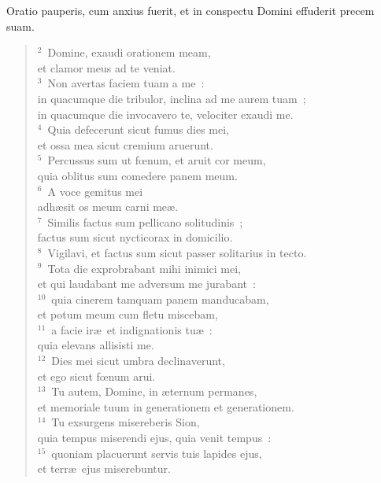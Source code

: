 \bchapter
\lettrine[lines=3,image=true,loversize=0.05,lraise=-0.03]{O}{}ratio pauperis, cum anxius fuerit, et in conspectu Domini effuderit precem suam.
\begin{flushleft}\begin{verse}\vspace{6pt}${}^{2}$~Domine, exaudi orationem meam,\\ et clamor meus ad te veniat.\\
${}^{3}$~Non avertas faciem tuam a me~:\\ in quacumque die tribulor, inclina ad me aurem tuam~;\\ in quacumque die invocavero te, velociter exaudi me.\\
${}^{4}$~Quia defecerunt sicut fumus dies mei,\\ et ossa mea sicut cremium aruerunt.\\
${}^{5}$~Percussus sum ut fœnum, et aruit cor meum,\\ quia oblitus sum comedere panem meum.\\
${}^{6}$~A voce gemitus mei\\ adh\ae sit os meum carni me\ae .\\
${}^{7}$~Similis factus sum pellicano solitudinis~;\\ factus sum sicut nycticorax in domicilio.\\
${}^{8}$~Vigilavi, et factus sum sicut passer solitarius in tecto.\\
${}^{9}$~Tota die exprobrabant mihi inimici mei,\\ et qui laudabant me adversum me jurabant~:\\
${}^{10}$~quia cinerem tamquam panem manducabam,\\ et potum meum cum fletu miscebam,\\
${}^{11}$~a facie ir\ae\ et indignationis tu\ae~:\\ quia elevans allisisti me.\\
${}^{12}$~Dies mei sicut umbra declinaverunt,\\ et ego sicut fœnum arui.\\
${}^{13}$~Tu autem, Domine, in \ae ternum permanes,\\ et memoriale tuum in generationem et generationem.\\
${}^{14}$~Tu exsurgens misereberis Sion,\\ quia tempus miserendi ejus, quia venit tempus~:\\
${}^{15}$~quoniam placuerunt servis tuis lapides ejus,\\ et terr\ae\ ejus miserebuntur.\\

\end{verse}
\end{flushleft}
